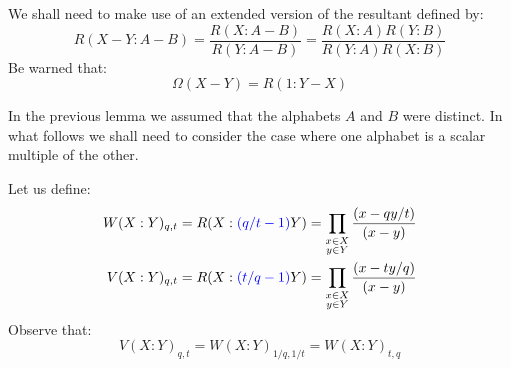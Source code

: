 \documentclass[12pt,dvips]{amsart}
\newtheorem{lemma}{Lemma}[section]
\begin{document}
 





We shall need to make use of an extended version of the resultant defined by:
$$ R(X - Y : A - B) = \frac{R(X : A - B)}{R(Y : A - B)} 
= \frac{R(X : A)R(Y:B)}{R(Y : A)R(X : B)}$$
Be warned that:
$$ \Omega( X - Y ) = R( 1 : Y - X) $$

\medskip
\noindent
In the previous lemma we assumed that the alphabets $A$ and $B$ were distinct. In what follows we shall need to consider the case where one alphabet is a scalar multiple of the other.


\medskip
\noindent
Let us define:
\begin{align*}
W(X : Y)_{q,t} & =  R(X: {\color{blue}(q/t - 1)} Y) =  \prod_{\substack{x \in X \\ y \in Y}} \frac{(x - qy/t)}{(x-y)} \\
V(X : Y)_{q,t} & =  R(X: {\color{blue}(t/q - 1)} Y) = \prod_{\substack{x \in X \\ y \in Y}} \frac{(x - ty/q)}{(x-y)} 
\end{align*}
Observe that:
$$ V(X : Y)_{q,t} = W(X : Y)_{1/q, 1/t} = W(X : Y)_{t,q} $$
\end{document}
